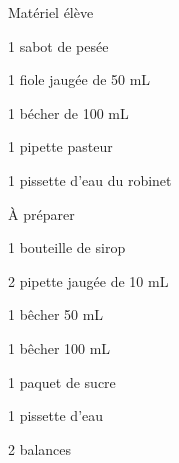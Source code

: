 
\begin{boiteMateriel}{Matériel élève}
  \effectifSeconde

  \begin{protocole}[2]
    \item 1 sabot de pesée
    \item 1 fiole jaugée de 50 mL
    \item 1 bécher de 100 mL
    \item 1 pipette pasteur
    \item 1 pissette d’eau du robinet
    \item [\vspace{\fill}]
  \end{protocole}
\end{boiteMateriel}


\begin{boiteMateriel}{À préparer}
  \vspace*{4pt}
  \begin{protocole}[2]
    \item 1 bouteille de sirop
    \item 2 pipette jaugée de 10 mL
    \item 1 bêcher 50 mL
    \item 1 bêcher 100 mL
    \item 1 paquet de sucre
    \item 1 pissette d’eau
    \item 2 balances
    \item [\vspace{\fill}]
  \end{protocole}
\end{boiteMateriel}